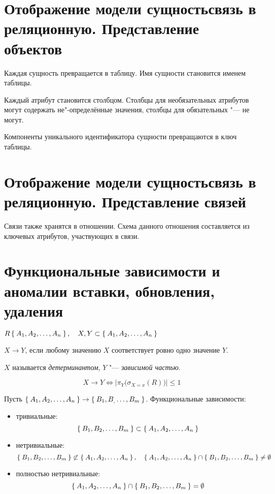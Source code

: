 \section{Отображение модели сущностьсвязь в реляционную. Представление объектов}

Каждая сущность превращается в таблицу.
Имя сущности становится именем таблицы.

Каждый атрибут становится столбцом.
Столбцы для необязательных атрибутов могут содержать не"-определённые значения, столбцы для обязательных "--- не могут.

Компоненты уникального идентификатора сущности превращаются в ключ таблицы.

\section{Отображение модели сущностьсвязь в реляционную. Представление связей}

Связи также хранятся в отношении.
Схема данного отношения составляется из ключевых атрибутов, участвующих в связи.

\section{Функциональные зависимости и аномалии вставки, обновления, удаления}

\begin{definition}
	$ R \Set{A_1, A_2, \dots, A_n}, \quad X, Y \subset \Set{A_1, A_2, \dots, A_n} $

	$ X \to Y $, если любому значению $ X $ соответствует ровно одно значение $ Y $.

	$ X $ называется \emph{детерминантом}, $ Y $ "--- \emph{зависимой частью}.
\end{definition}

$$ X \to Y \iff \left| \pi_Y \bigl( \sigma_{X = x}(R) \bigr) \right| \le 1 $$

Пусть $ \Set{A_1, A_2, \dots, A_n} \to \Set{B_1, B_, \dots, B_m} $.
Функциональные зависимости:
\begin{itemize}
	\item тривиальные:
		$$ \Set{B_1, B_2, \dots, B_m} \subset \Set{A_1, A_2, \dots, A_n} $$
	\item нетривиальные:
		$$ \Set{B_1, B_2, \dots, B_m} \not\subset \Set{A_1, A_2, \dots, A_n}, \quad \Set{A_1, A_2, \dots, A_n} \cap \Set{B_1, B_2, \dots, B_m} \ne \emptyset $$
	\item полностью нетривиальные:
		$$ \Set{A_1, A_2, \dots, A_n} \cap \Set{B_1, B_2, \dots, B_m} = \emptyset $$
\end{itemize}

